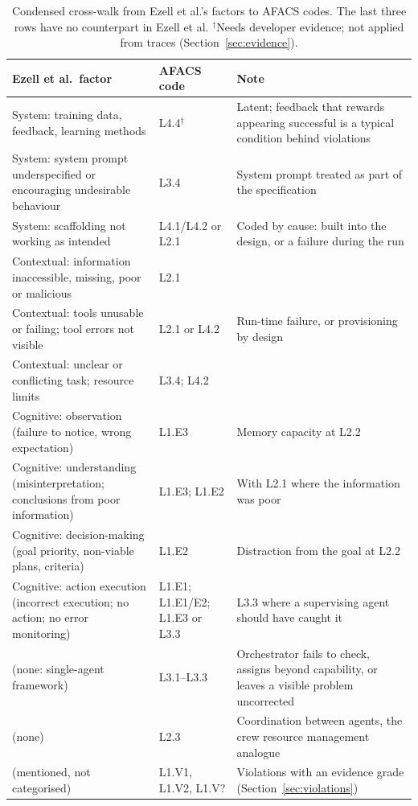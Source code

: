 \documentclass[10pt,a4paper]{article}
\begin{document}
\begin{table}[tbp]
\centering
\caption{Condensed cross-walk from Ezell et al.'s factors to AFACS codes. The
last three rows have no counterpart in Ezell et al. $^{\dagger}$Needs
developer evidence; not applied from traces (Section~\ref{sec:evidence}).}
\label{tab:crosswalk}
\small
\begin{tabular}{@{}L{5.5cm}L{3.4cm}L{5.9cm}@{}}
\toprule
Ezell et al.\ factor & AFACS code & Note\\
\midrule
System: training data, feedback, learning methods & L4.4$^{\dagger}$ & Latent; feedback that rewards appearing successful is a typical condition behind violations\\
System: system prompt underspecified or encouraging undesirable behaviour & L3.4 & System prompt treated as part of the specification\\
System: scaffolding not working as intended & L4.1/L4.2 or L2.1 & Coded by cause: built into the design, or a failure during the run\\
Contextual: information inaccessible, missing, poor or malicious & L2.1 & \\
Contextual: tools unusable or failing; tool errors not visible & L2.1 or L4.2 & Run-time failure, or provisioning by design\\
Contextual: unclear or conflicting task; resource limits & L3.4; L4.2 & \\
Cognitive: observation (failure to notice, wrong expectation) & L1.E3 & Memory capacity at L2.2\\
Cognitive: understanding (misinterpretation; conclusions from poor information) & L1.E3; L1.E2 & With L2.1 where the information was poor\\
Cognitive: decision-making (goal priority, non-viable plans, criteria) & L1.E2 & Distraction from the goal at L2.2\\
Cognitive: action execution (incorrect execution; no action; no error monitoring) & L1.E1; L1.E1/E2; L1.E3 or L3.3 & L3.3 where a supervising agent should have caught it\\
\midrule
(none: single-agent framework) & L3.1--L3.3 & Orchestrator fails to check, assigns beyond capability, or leaves a visible problem uncorrected\\
(none) & L2.3 & Coordination between agents, the crew resource management analogue\\
(mentioned, not categorised) & L1.V1, L1.V2, L1.V? & Violations with an evidence grade (Section~\ref{sec:violations})\\
\bottomrule
\end{tabular}
\end{table}
\end{document}
